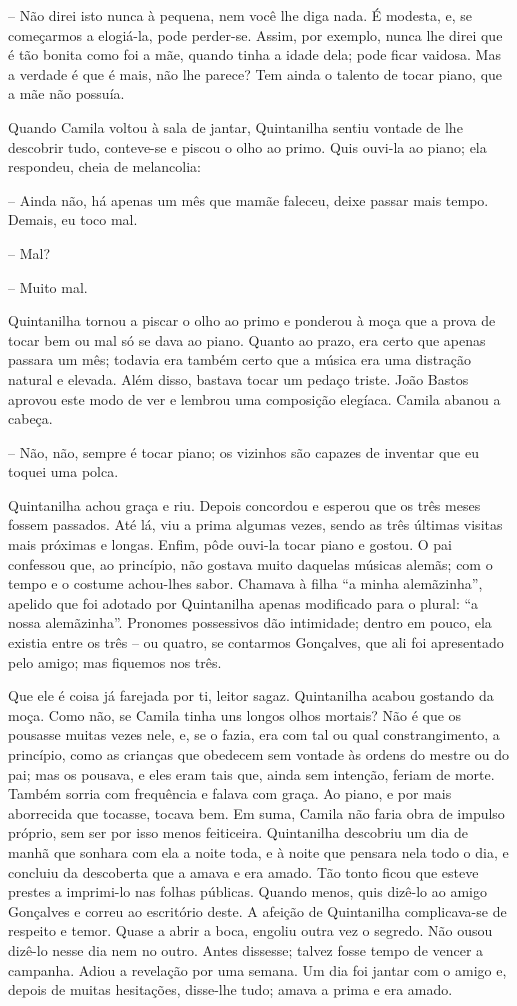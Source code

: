 -- Não direi isto nunca à pequena, nem você lhe diga nada. É modesta, e,
se começarmos a elogiá-la, pode perder-se. Assim, por exemplo, nunca lhe
direi que é tão bonita como foi a mãe, quando tinha a idade dela; pode
ficar vaidosa. Mas a verdade é que é mais, não lhe parece? Tem ainda o
talento de tocar piano, que a mãe não possuía.

Quando Camila voltou à sala de jantar, Quintanilha sentiu vontade de lhe
descobrir tudo, conteve-se e piscou o olho ao primo. Quis ouvi-la ao
piano; ela respondeu, cheia de melancolia:

-- Ainda não, há apenas um mês que mamãe faleceu, deixe passar mais
tempo. Demais, eu toco mal.

-- Mal?

-- Muito mal.

Quintanilha tornou a piscar o olho ao primo e ponderou à moça que a
prova de tocar bem ou mal só se dava ao piano. Quanto ao prazo, era
certo que apenas passara um mês; todavia era também certo que a música
era uma distração natural e elevada. Além disso, bastava tocar um pedaço
triste. João Bastos aprovou este modo de ver e lembrou uma composição
elegíaca. Camila abanou a cabeça.

-- Não, não, sempre é tocar piano; os vizinhos são capazes de inventar
que eu toquei uma polca.

Quintanilha achou graça e riu. Depois concordou e esperou que os três
meses fossem passados. Até lá, viu a prima algumas vezes, sendo as três
últimas visitas mais próximas e longas. Enfim, pôde ouvi-la tocar piano
e gostou. O pai confessou que, ao princípio, não gostava muito daquelas
músicas alemãs; com o tempo e o costume achou-lhes sabor. Chamava à
filha ``a minha alemãzinha'', apelido que foi adotado por Quintanilha
apenas modificado para o plural: ``a nossa alemãzinha''. Pronomes
possessivos dão intimidade; dentro em pouco, ela existia entre os três
-- ou quatro, se contarmos Gonçalves, que ali foi apresentado pelo
amigo; mas fiquemos nos três.

Que ele é coisa já farejada por ti, leitor sagaz. Quintanilha acabou
gostando da moça. Como não, se Camila tinha uns longos olhos mortais?
Não é que os pousasse muitas vezes nele, e, se o fazia, era com tal ou
qual constrangimento, a princípio, como as crianças que obedecem sem
vontade às ordens do mestre ou do pai; mas os pousava, e eles eram tais
que, ainda sem intenção, feriam de morte. Também sorria com frequência e
falava com graça. Ao piano, e por mais aborrecida que tocasse, tocava
bem. Em suma, Camila não faria obra de impulso próprio, sem ser por isso
menos feiticeira. Quintanilha descobriu um dia de manhã que sonhara com
ela a noite toda, e à noite que pensara nela todo o dia, e concluiu da
descoberta que a amava e era amado. Tão tonto ficou que esteve prestes a
imprimi-lo nas folhas públicas. Quando menos, quis dizê-lo ao amigo
Gonçalves e correu ao escritório deste. A afeição de Quintanilha
complicava-se de respeito e temor. Quase a abrir a boca, engoliu outra
vez o segredo. Não ousou dizê-lo nesse dia nem no outro. Antes dissesse;
talvez fosse tempo de vencer a campanha. Adiou a revelação por uma
semana. Um dia foi jantar com o amigo e, depois de muitas hesitações,
disse-lhe tudo; amava a prima e era amado.

